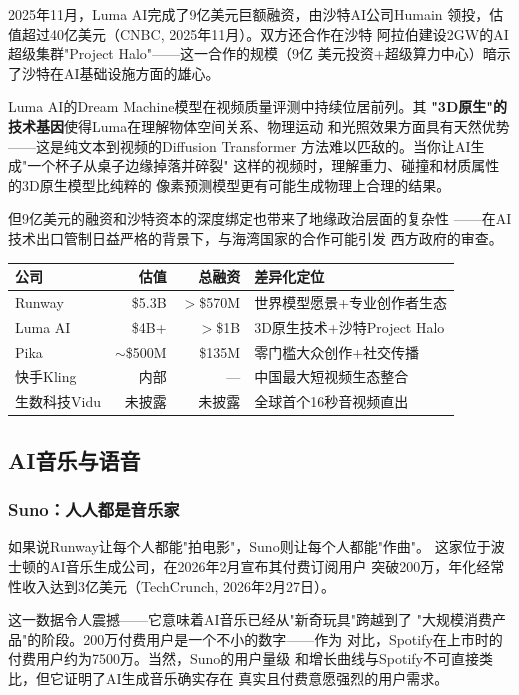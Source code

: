 2025年11月，Luma AI完成了9亿美元巨额融资，由沙特AI公司Humain
领投，估值超过40亿美元（CNBC, 2025年11月）。双方还合作在沙特
阿拉伯建设2GW的AI超级集群"Project Halo"——这一合作的规模（9亿
美元投资+超级算力中心）暗示了沙特在AI基础设施方面的雄心。

Luma AI的Dream Machine模型在视频质量评测中持续位居前列。其
\textbf{"3D原生"的技术基因}使得Luma在理解物体空间关系、物理运动
和光照效果方面具有天然优势——这是纯文本到视频的Diffusion Transformer
方法难以匹敌的。当你让AI生成"一个杯子从桌子边缘掉落并碎裂"
这样的视频时，理解重力、碰撞和材质属性的3D原生模型比纯粹的
像素预测模型更有可能生成物理上合理的结果。

但9亿美元的融资和沙特资本的深度绑定也带来了地缘政治层面的复杂性
——在AI技术出口管制日益严格的背景下，与海湾国家的合作可能引发
西方政府的审查。

\begin{keybox}
\small
\begin{tabularx}{\textwidth}{l r r X}
\toprule
\rowcolor{figLightGray}
\textbf{公司} & \textbf{估值} & \textbf{总融资} & \textbf{差异化定位} \\
\midrule
Runway       & \$5.3B  & $>$\$570M & 世界模型愿景+专业创作者生态 \\
Luma AI      & \$4B+   & $>$\$1B   & 3D原生技术+沙特Project Halo \\
Pika         & $\sim$\$500M & \$135M & 零门槛大众创作+社交传播 \\
快手Kling     & 内部     & ---      & 中国最大短视频生态整合 \\
生数科技Vidu   & 未披露  & 未披露   & 全球首个16秒音视频直出 \\
\bottomrule
\end{tabularx}
\end{keybox}

\subsection{AI音乐与语音}
\label{subsec:audio-gen}

\subsubsection{Suno：人人都是音乐家}
如果说Runway让每个人都能"拍电影"，Suno则让每个人都能"作曲"。
这家位于波士顿的AI音乐生成公司，在2026年2月宣布其付费订阅用户
突破200万，年化经常性收入达到3亿美元（TechCrunch, 2026年2月27日）。

这一数据令人震撼——它意味着AI音乐已经从"新奇玩具"跨越到了
"大规模消费产品"的阶段。200万付费用户是一个不小的数字——作为
对比，Spotify在上市时的付费用户约为7500万。当然，Suno的用户量级
和增长曲线与Spotify不可直接类比，但它证明了AI生成音乐确实存在
真实且付费意愿强烈的用户需求。

